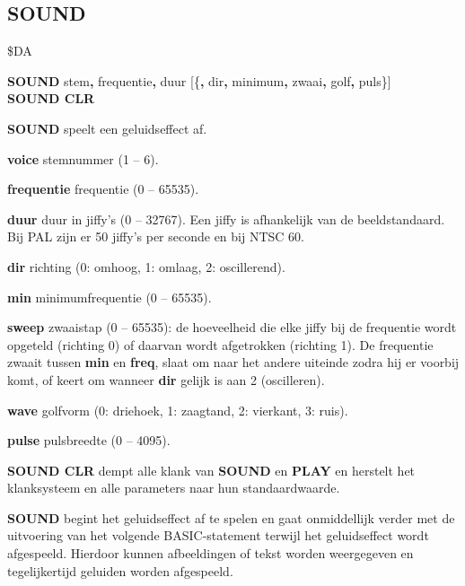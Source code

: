\subsection{SOUND}
\begin{description}[leftmargin=2cm,style=nextline]
\item [Token:]    \$DA

\item [Formaat:]   {\bf SOUND} stem{\bf,} frequentie{\bf,} duur [\{{\bf,} dir{\bf,} minimum{\bf,} zwaai{\bf,} golf{\bf,} puls\}] \\                 {\bf SOUND CLR}

\item [Gebruik:]    {\bf SOUND} speelt een geluidseffect af.

                  {\bf voice} stemnummer (1 -- 6).

                  {\bf frequentie} frequentie (0 -- 65535).

                  {\bf duur} duur in jiffy's (0 -- 32767). Een jiffy is afhankelijk van de beeldstandaard. Bij PAL zijn er 50 jiffy's per seconde en bij NTSC 60.

                  {\bf dir} richting (0: omhoog, 1: omlaag, 2: oscillerend).

                  {\bf min} minimumfrequentie (0 -- 65535).

                  {\bf sweep} zwaaistap (0 -- 65535): de hoeveelheid die elke jiffy bij de frequentie wordt opgeteld (richting 0) of daarvan wordt afgetrokken (richting 1). De frequentie zwaait tussen {\bf min} en {\bf freq}, slaat om naar het andere uiteinde zodra hij er voorbij komt, of keert om wanneer {\bf dir} gelijk is aan 2 (oscilleren).

                  {\bf wave} golfvorm (0: driehoek, 1: zaagtand, 2: vierkant, 3: ruis).

                  {\bf pulse} pulsbreedte (0 -- 4095).

                  {\bf SOUND CLR} dempt alle klank van {\bf SOUND} en {\bf PLAY} en herstelt het klanksysteem en alle parameters naar hun standaardwaarde.

\item [Opmerkingen:]  {\bf SOUND} begint het geluidseffect af te spelen en gaat onmiddellijk verder met de uitvoering van het volgende BASIC-statement terwijl het geluidseffect wordt afgespeeld. Hierdoor kunnen afbeeldingen of tekst worden weergegeven en tegelijkertijd geluiden worden afgespeeld.


\end{description}
